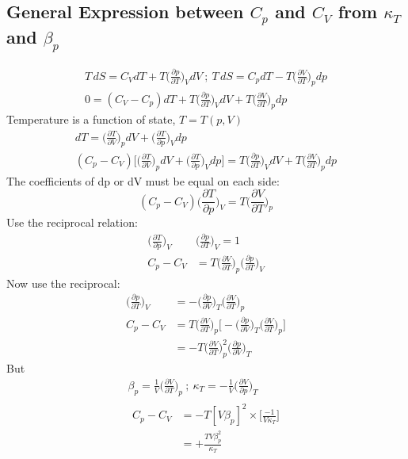 \documentclass[a4paper, 11pt, normalem]{report}
\newcommand\p{\partial}
\begin{document}
\subsection{General Expression between $C_p$ and $C_V$ from $\kappa_T$ and $\beta_p$}
\begin{gather*}
    T\,dS = C_V dT + T\Big(\frac{\p p}{\p T}\Big)_V dV ~;~ T\,dS = C_p dT - T\Big(\frac{\p V}{\p T}\Big)_p dp \\
    0 = (C_V - C_p)dT + T \Big(\frac{\p p}{\p T}\Big)_V dV + T\Big(\frac{\p V}{\p T}\Big)_p dp
\end{gather*}
Temperature is a function of state, $T = T(p,V)$
\begin{gather*}
    dT = \Big(\frac{\p T}{\p V}\Big)_p dV + \Big(\frac{\p T}{\p p}\Big)_V dp \\
    (C_p - C_V)\Bigg[\Big(\frac{\p T}{\p V}\Big)_p dV + \Big(\frac{\p T}{\p p}\Big)_V dp \Bigg] = T \Big(\frac{\p p}{\p T}\Big)_V dV + T\Big(\frac{\p V}{\p T}\Big)_p dp
\end{gather*}
The coefficients of dp or dV must be equal on each side:
\begin{equation*}
    (C_p - C_V)\Big(\frac{\p T}{\p p}\Big)_V = T\Big(\frac{\p V}{\p T}\Big)_p
\end{equation*}
Use the reciprocal relation:
\begin{align*}
    \Big(\frac{\p T}{\p p}\Big)_V &\Big(\frac{\p p}{\p T}\Big)_V = 1 \\
    C_p - C_V &= T\Big(\frac{\p V}{\p T}\Big)_p \Big(\frac{\p p}{\p T}\Big)_V
\end{align*}
Now use the reciprocal:
\begin{align*}
    \Big(\frac{\p p}{\p T}\Big)_V &= -\Big(\frac{\p p}{\p V}\Big)_T \Big(\frac{\p V}{\p T}\Big)_p \\
    C_p - C_V &= T\Big(\frac{\p V}{\p T}\Big)_p \Bigg[-\Big(\frac{\p p}{\p V}\Big)_T \Big(\frac{\p V}{\p T}\Big)_p \Bigg] \\
    &= -T\Big(\frac{\p V}{\p T}\Big)_{p}^2 \Big(\frac{\p p}{\p V}\Big)_T
\end{align*}
But
\begin{gather*}
    \beta_p = \frac{1}{V} \Big(\frac{\p V}{\p T}\Big)_{p} ~;~ \kappa_T = -\frac{1}{V} \Big(\frac{\p V}{\p p}\Big)_{T} \\
    \begin{aligned}
        C_p - C_V &= -T[V\beta_p]^2 \times \bigg[\frac{-1}{V\kappa_T}\bigg] \\
        &= + \frac{TV\beta_{p}^2}{\kappa_T}
    \end{aligned}
\end{gather*}
\end{document}

